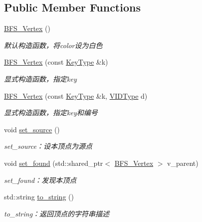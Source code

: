\subsection*{Public Member Functions}
\begin{DoxyCompactItemize}
\item 
\hyperlink{struct_introduction_to_algorithm_1_1_graph_algorithm_1_1_b_f_s___vertex_ad9540a9d7487eea8ece6ac1b0bbfcc22}{B\+F\+S\+\_\+\+Vertex} ()
\begin{DoxyCompactList}\small\item\em 默认构造函数，将{\ttfamily color}设为白色 \end{DoxyCompactList}\item 
\hyperlink{struct_introduction_to_algorithm_1_1_graph_algorithm_1_1_b_f_s___vertex_abf41ef42dff5af509e9b42658882f604}{B\+F\+S\+\_\+\+Vertex} (const \hyperlink{struct_introduction_to_algorithm_1_1_graph_algorithm_1_1_b_f_s___vertex_a1e47ba34939458c68d7ccee8ebeccad2}{Key\+Type} \&k)
\begin{DoxyCompactList}\small\item\em 显式构造函数，指定{\ttfamily key} \end{DoxyCompactList}\item 
\hyperlink{struct_introduction_to_algorithm_1_1_graph_algorithm_1_1_b_f_s___vertex_a3765fd695d8452180bafbb42baec744f}{B\+F\+S\+\_\+\+Vertex} (const \hyperlink{struct_introduction_to_algorithm_1_1_graph_algorithm_1_1_b_f_s___vertex_a1e47ba34939458c68d7ccee8ebeccad2}{Key\+Type} \&k, \hyperlink{struct_introduction_to_algorithm_1_1_graph_algorithm_1_1_b_f_s___vertex_a62cef758843cdaeefae2fc196f6bdb46}{V\+I\+D\+Type} d)
\begin{DoxyCompactList}\small\item\em 显式构造函数，指定{\ttfamily key}和编号 \end{DoxyCompactList}\item 
void \hyperlink{struct_introduction_to_algorithm_1_1_graph_algorithm_1_1_b_f_s___vertex_a3f5b9ba686fae02e01cd899261fe6793}{set\+\_\+source} ()
\begin{DoxyCompactList}\small\item\em set\+\_\+source：设本顶点为源点 \end{DoxyCompactList}\item 
void \hyperlink{struct_introduction_to_algorithm_1_1_graph_algorithm_1_1_b_f_s___vertex_a7e523d76f261801c3622f00458333320}{set\+\_\+found} (std\+::shared\+\_\+ptr$<$ \hyperlink{struct_introduction_to_algorithm_1_1_graph_algorithm_1_1_b_f_s___vertex}{B\+F\+S\+\_\+\+Vertex} $>$ v\+\_\+parent)
\begin{DoxyCompactList}\small\item\em set\+\_\+found：发现本顶点 \end{DoxyCompactList}\item 
std\+::string \hyperlink{struct_introduction_to_algorithm_1_1_graph_algorithm_1_1_b_f_s___vertex_a73aa1fb33a2616818b709d04e79a007e}{to\+\_\+string} ()
\begin{DoxyCompactList}\small\item\em to\+\_\+string：返回顶点的字符串描述 \end{DoxyCompactList}\end{DoxyCompactItemize}
